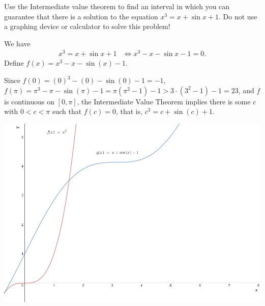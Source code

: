 \documentclass[nooutcomes, handout]{ximera}
\begin{document}
\begin{problem}
  Use the Intermediate value theorem to find an interval in which you can guarantee that there is a solution to the equation $x^3 = x + \sin x + 1$.
  Do not use a graphing device or calculator to solve this problem!
  \begin{freeResponse}
    We have
    \begin{align*}
      x^3 = x + \sin x + 1 &\iff x^3 - x - \sin x - 1 = 0.
    \end{align*}
  Define $f(x) =  x^3 - x - \sin(x) - 1$.

    Since $f(0) = (0)^3 - (0) - \sin(0)-1 = -1$,  $f(\pi) = \pi^3 - \pi - \sin(\pi)-1 = \pi(\pi^2 - 1) - 1 > 3 \cdot (3^2 - 1) - 1 = 23$, and $f$ is continuous on $[0, \pi]$, the Intermediate Value Theorem implies there is some $c$ with $0 < c < \pi$ such that $f(c) = 0$, that is, $c^3 = c + \sin (c) + 1$.

	\begin{image}
	\includegraphics[scale=.5]{Figure3.png}
	\end{image}


  \end{freeResponse}
\end{problem}
	
\end{document}
